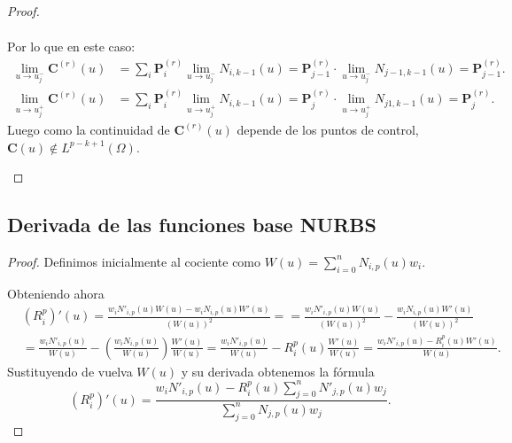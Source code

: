 \documentclass[11pt]{book}
\theoremstyle{plain} %
\theoremstyle{definition} %
\theoremstyle{definition} %
\begin{document}
\begin{proof}
\begin{enumerate}
\begin{align*}
            \end{align*}
            Por lo que en este caso:
             \begin{align*}
                \lim_{u \to u_j^-} \mathbf{C}^{(r)}(u) &= \sum_{i} \mathbf{P}_i^{(r)} \lim_{u \to u_j^-} N_{i, k-1}(u) = \mathbf{P}_{j-1}^{(r)} \cdot \lim_{u \to u_j^-} N_{j-1, k-1}(u) = \mathbf{P}_{j-1}^{(r)}.\\
                \lim_{u \to u_j^+} \mathbf{C}^{(r)}(u) &= \sum_{i} \mathbf{P}_i^{(r)} \lim_{u \to u_j^+} N_{i, k-1}(u) = \mathbf{P}_{j}^{(r)} \cdot \lim_{u \to u_j^+} N_{j1, k-1}(u) = \mathbf{P}_{j}^{(r)}.
            \end{align*}
            Luego como la continuidad de $\mathbf{C}^{(r)}(u)$ depende de los puntos de control, $\mathbf{C}(u)\notin L^{p-k+1}(\Omega)$. 
        \end{enumerate}
\end{proof}

\subsection{Derivada de las funciones base NURBS}
\label{sec:Derv_basis_NURBS}
\begin{proof}
    Definimos inicialmente al cociente como $W(u) = \sum_{i=0}^{n} N_{i,p}(u) w_i$.

    Obteniendo ahora 
    \begin{align*}
        &(R_i^p)'(u) = \frac{w_i N'_{i,p}(u) W(u) - w_i N_{i,p}(u) W'(u)}{(W(u))^2}==\frac{w_i N'_{i,p}(u) W(u)}{(W(u))^2} - \frac{w_i N_{i,p}(u) W'(u)}{(W(u))^2}\\
        &=\frac{w_i N'_{i,p}(u)}{W(u)} - \left( \frac{w_i N_{i,p}(u)}{W(u)} \right) \frac{W'(u)}{W(u)}=\frac{w_i N'_{i,p}(u)}{W(u)} - R_i^p(u) \frac{W'(u)}{W(u)}=\frac{w_i N'_{i,p}(u) - R_i^p(u) W'(u)}{W(u)}.
    \end{align*}
    Sustituyendo de vuelva $W(u)$ y su derivada obtenemos la fórmula
    $$(R_i^p)'(u) = \frac{w_i N'_{i,p}(u) - R_i^p(u) \sum_{j=0}^{n} N'_{j,p}(u) w_j}{\sum_{j=0}^{n} N_{j,p}(u) w_j}.$$
\end{proof}
\end{document}

